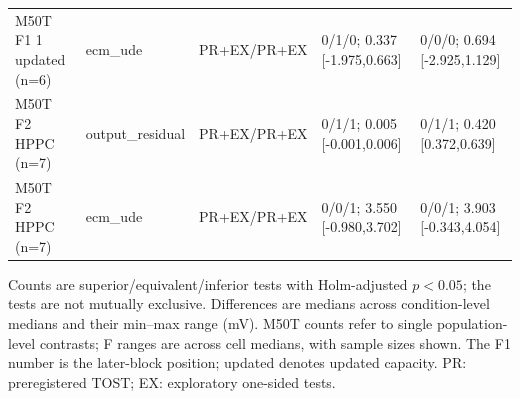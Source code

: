\begin{table}[t]
\begin{tabular}{lllll}
M50T F1 1 updated (n=6) & ecm\_ude & PR+EX/PR+EX & 0/1/0; 0.337 [-1.975,0.663] & 0/0/0; 0.694 [-2.925,1.129] \\
M50T F2 HPPC (n=7) & output\_residual & PR+EX/PR+EX & 0/1/1; 0.005 [-0.001,0.006] & 0/1/1; 0.420 [0.372,0.639] \\
M50T F2 HPPC (n=7) & ecm\_ude & PR+EX/PR+EX & 0/0/1; 3.550 [-0.980,3.702] & 0/0/1; 3.903 [-0.343,4.054] \\
\bottomrule
\end{tabular}
\vspace{2pt}
\parbox{\textwidth}{\footnotesize Counts are superior/equivalent/inferior tests with Holm-adjusted $p<0.05$; the tests are not mutually exclusive. Differences are medians across condition-level medians and their min--max range (mV). M50T counts refer to single population-level contrasts; F ranges are across cell medians, with sample sizes shown. The F1 number is the later-block position; updated denotes updated capacity. PR: preregistered TOST; EX: exploratory one-sided tests.}
\end{table}
